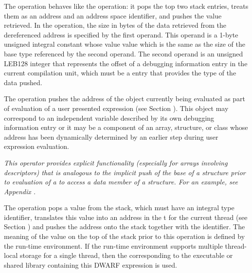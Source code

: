 \begin{enumerate}[1. ]
\itembfnl{\DWOPxdereftypeTARG}
The \DWOPxdereftypeNAME{} operation behaves like the \DWOPxderefsize{}
operation: it pops the top two stack entries, treats them as an address and
an address space identifier, and pushes the value retrieved. In the
\DWOPxdereftypeNAME{} operation, the size in bytes of the data retrieved from
the dereferenced address is specified by the first operand. This operand is
a 1-byte unsigned integral constant whose value 
value which is the same as the size of the base type referenced
by the second operand. The second
operand is an unsigned LEB128 integer that represents the offset of a
debugging information entry in the current compilation unit, which must be a
\DWTAGbasetype{} entry that provides the type of the data pushed.

\itembfnl{\DWOPpushobjectaddressTARG}
The \DWOPpushobjectaddressNAME{} operation pushes the address of the
object currently being evaluated as part of evaluation of a user
presented expression (see Section
). This object may
correspond to an independent variable described by its own debugging
information entry or it may be a component of an array, structure, or
class whose address has been dynamically determined by an earlier step
during user expression evaluation.

\textit{This operator provides explicit functionality
(especially for arrays involving descriptors) that is analogous
to the implicit push of the base 
of a structure prior to evaluation of a 
\DWATdatamemberlocation{} 
to access a data member of a structure. For an example, see 
Appendix .}

\itembfnl{\DWOPformtlsaddressTARG}

The \DWOPformtlsaddressNAME{} operation pops a value from the stack,
which must have an integral type identifier, translates this value
into an address in the t for the
current thread (see Section )
and pushes the address onto the stack together with the \generictype
identifier. The meaning of the value on the top of the stack prior to
this operation is defined by the run-time environment.  If the
run-time environment supports multiple thread-local storage
 for a single thread, then the 
corresponding to the executable or shared library containing this
DWARF expression is used.
   

\end{enumerate}
